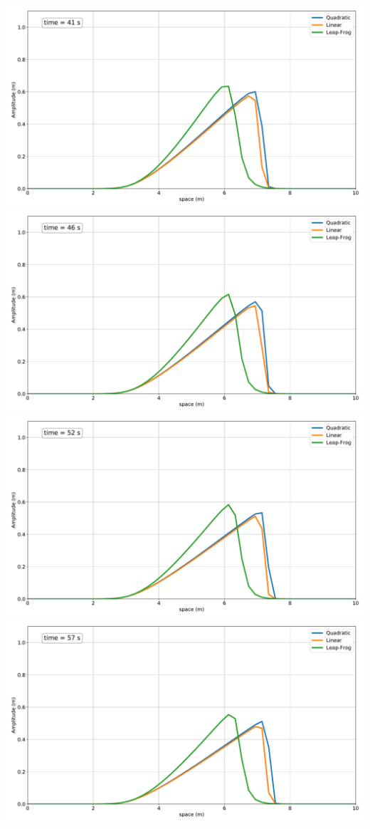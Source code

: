 \includegraphics[width=\linewidth]{../BurgersEquation/images/imp8.pdf}
\includegraphics[width=\linewidth]{../BurgersEquation/images/imp9.pdf}
\includegraphics[width=\linewidth]{../BurgersEquation/images/imp10.pdf}
\includegraphics[width=\linewidth]{../BurgersEquation/images/imp11.pdf}
